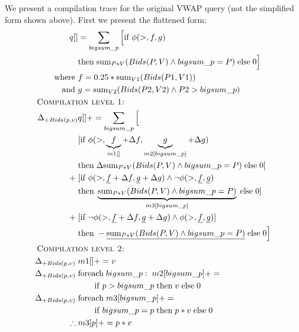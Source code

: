 \begin{example}
We present a compilation trace for the original VWAP query (not the simplified
form shown above). First we present the flattened form:
\begin{align*}
q[] & = \sum_{bigsum\_p}{\Big[\algif \; \phi(>, f, g) }\\
    & \algthen \; \algsum_{P*V}(Bids(P,V) \wedge bigsum\_p = P) \;
      \algelse \; 0 \Big]\\
\mbox{where } & f = 0.25*\algsum_{V1}(Bids(P1,V1))\\
\mbox{and } & g = \algsum_{V2}(Bids(P2,V2) \wedge P2 > bigsum\_p)
\\
& \hspace{-1.75cm}\mbox{\sc Compilation level 1:}\\
\Delta_{+Bids(p,v)} & q[] += \sum_{bigsum\_p} \Big[ \\
& [ \algif \; \phi(>,\underbrace{f}_{m1[]}+\Delta f, \underbrace{g}_{m2[bigsum\_p]}+\Delta g) \; \\
& \algthen \; \Delta \algsum_{P*V}(Bids(P,V) \wedge bigsum\_p = P) \;
    \algelse \; 0 ] \\
+ \; & [ \algif \; \phi(>,\underline{f}+\Delta f, \underline{g}+\Delta g) \wedge
    \neg\phi(>,\underline{f},\underline{g}) \\
& \algthen \; \underbrace{\algsum_{P*V}(Bids(P,V) \wedge
    bigsum\_p = P)}_{m3[bigsum\_p]} \;
    \algelse \; 0 ] \\
+ \; & [ \algif \; \neg \phi(>, \underline{f}+\Delta f, \underline{g}+\Delta g)
    \wedge \phi(>,\underline{f},\underline{g}) ] \\
& \algthen \; - \underline{\algsum_{P*V}(Bids(P,V) \wedge bigsum\_p = P)} \;
    \algelse \; 0
\Big]\\
& \hspace{-1.75cm}\mbox{\sc Compilation level 2:}\\
\Delta_{+Bids(p,v)} \; & m1[] += v\\
\Delta_{+Bids(p,v)} \; & \algforeach \; bigsum\_p : \; m2[bigsum\_p] += \\
& \qquad \algif \; p > bigsum\_p \;\algthen \; v \; \algelse \; 0 \\
\Delta_{+Bids(p,v)} \; & \algforeach \; m3[bigsum\_p] += \\
& \qquad \algif \; bigsum\_p = p \; \algthen \; p*v \; \algelse \; 0\\
\therefore \; & m3[p] += p*v
\end{align*}
\end{example}

